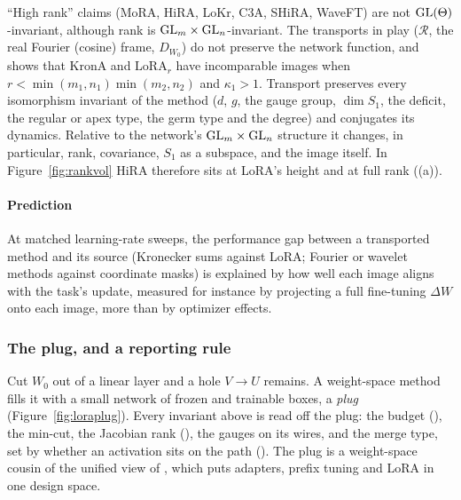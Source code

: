 \begin{explains}
``High rank'' claims (MoRA, HiRA, LoKr, C3A, SHiRA, WaveFT) are not $\mathrm{GL}(\Theta)$-invariant, although rank is
$\mathrm{GL}_m\times\mathrm{GL}_n$-invariant. The transports in play ($\mathcal R$, the real Fourier (cosine) frame, $D_{W_0}$) do not
preserve the network function, and  shows that KronA and $\mathrm{LoRA}_r$ have incomparable
images when $r<\min(m_1,n_1)\min(m_2,n_2)$ and $\kappa_1>1$. Transport preserves every isomorphism invariant of the
method ($d$, $g$, the gauge group, $\dim S_1$, the deficit, the regular or apex type, the germ type and the degree) and
conjugates its dynamics. Relative to the network's $\mathrm{GL}_m\times\mathrm{GL}_n$ structure it changes, in particular, rank,
covariance, $S_1$ as a subspace, and the image itself. In Figure~\ref{fig:rankvol} HiRA therefore sits at LoRA's height
and at full rank ((a)).
\end{explains}

\paragraph{Prediction}
At matched learning-rate sweeps, the performance gap between a transported method and its source (Kronecker sums against
LoRA; Fourier or wavelet methods against coordinate masks) is explained by how well each image aligns with the task's
update, measured for instance by projecting a full fine-tuning $\Delta W$ onto each image, more than by optimizer effects.

\subsubsection{The plug, and a reporting rule}\label{sec:cut-plug}

Cut $W_0$ out of a linear layer and a hole $V\to U$ remains. A weight-space method fills it with a small network of
frozen and trainable boxes, a \emph{plug} (Figure~\ref{fig:loraplug}). Every invariant above is read off the plug: the
budget (), the min-cut, the Jacobian rank (), the gauges on its wires,
and the merge type, set by whether an activation sits on the path (). The plug is a weight-space
cousin of the unified view of \citet{he2021unified}, which puts adapters, prefix tuning and LoRA in one design space.

